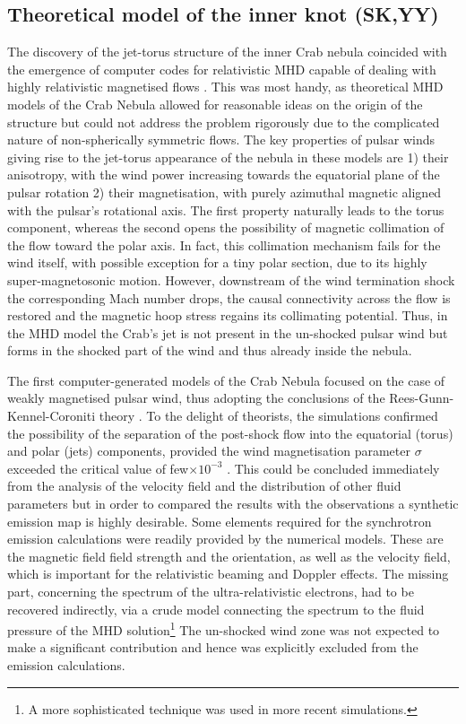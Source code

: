 \subsection{Theoretical model of the inner knot (SK,YY)}

The discovery of the jet-torus structure of the inner Crab nebula coincided with the emergence of computer codes for relativistic MHD capable of dealing with highly relativistic magnetised flows \citep{ssk-godun99}.  This was most handy, as theoretical MHD models of the Crab Nebula allowed for reasonable ideas on the origin of the structure but could not address the problem rigorously due to the complicated nature of non-spherically symmetric flows.   The  key properties of pulsar winds giving rise to the jet-torus 
appearance of the nebula in these models  are 1) their anisotropy, with the wind power increasing towards the equatorial plane of the pulsar rotation 2) their magnetisation, with purely azimuthal magnetic aligned with the pulsar’s rotational axis.  The first property naturally leads to the torus component, whereas the second opens the possibility of magnetic collimation of the flow toward the polar axis. In fact, this collimation  mechanism fails for the wind itself, with possible exception for a tiny polar section, due to its highly super-magnetosonic motion. However, downstream of the wind termination shock the corresponding Mach number drops, the causal connectivity across the flow is restored and the magnetic hoop stress regains its collimating  potential.  Thus, in the MHD model the Crab’s jet is not present in the un-shocked pulsar wind but forms in the shocked part of the wind and thus already inside the nebula.    

The first computer-generated models of the Crab Nebula focused on the case of weakly magnetised pulsar wind, thus adopting the conclusions of the Rees-Gunn-Kennel-Coroniti theory \citep{rees-gunn-74,kc84a,kc84b}.  To the delight of theorists, the simulations confirmed the possibility of the separation of the post-shock flow into the equatorial (torus)  and polar (jets) components, provided the wind magnetisation parameter $\sigma$ exceeded the critical value of few$ \times 10^{-3}$ \citep{ssk-lyub-03,ssk-lyub-04,delzanna-04,bogovalov-05}.  This could be concluded immediately from the analysis of the velocity field and the distribution of other fluid parameters but in order to compared the results with the observations a synthetic emission map is highly desirable. Some elements required for the synchrotron emission calculations were readily provided by the numerical models. These are the magnetic field field strength and the orientation, as well as the velocity field, which is important for the relativistic beaming and Doppler effects.   The missing part, concerning the spectrum of the ultra-relativistic electrons, had to be recovered indirectly, via a crude model connecting the spectrum to the fluid pressure of the MHD solution\footnote{A more sophisticated technique was used in more recent simulations. }  The un-shocked wind zone was not expected to make a significant contribution and hence was explicitly excluded from the emission calculations.

